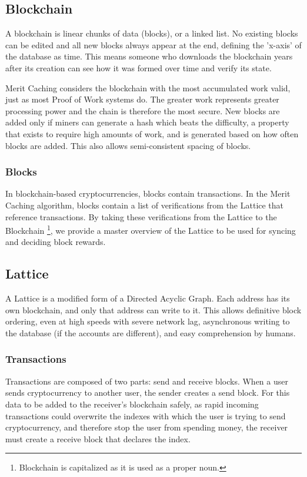 \documentclass[14pt]{article}
\begin{document}
\label{sec:1.1}
\subsection{Blockchain}
A blockchain is linear chunks of data (blocks), or a linked list. No existing blocks can be edited and all new blocks always appear at the end, defining the 'x-axis' of the database as time. This means someone who downloads the blockchain years after its creation can see how it was formed over time and verify its state. 

Merit Caching considers the blockchain with the most accumulated work valid, just as most Proof of Work systems do. The greater work represents greater processing power and the chain is therefore the most secure. New blocks are added only if miners can generate a hash which beats the difficulty, a property that exists to require high amounts of work, and is generated based on how often blocks are added. This also allows semi-consistent spacing of blocks.

\label{sec:1.1.1}
\subsubsection{Blocks}
In blockchain-based cryptocurrencies, blocks contain transactions. In the Merit Caching algorithm, blocks contain a list of verifications from the Lattice that reference transactions. By taking these verifications from the Lattice to the Blockchain \footnote{Blockchain is capitalized as it is used as a proper noun.}, we provide a master overview of the Lattice to be used for syncing and deciding block rewards.

\label{sec:1.2}
\subsection{Lattice}
A Lattice is a modified form of a Directed Acyclic Graph. Each address has its own blockchain, and only that address can write to it. This allows definitive block ordering, even at high speeds with severe network lag, asynchronous writing to the database (if the accounts are different), and easy comprehension by humans.

\label{sec:1.2.1}
\subsubsection{Transactions}
Transactions are composed of two parts: send and receive blocks. When a user sends cryptocurrency to another user, the sender creates a send block. For this data to be added to the receiver's blockchain safely, as rapid incoming transactions could overwrite the indexes with which the user is trying to send cryptocurrency, and therefore stop the user from spending money, the receiver must create a receive block that declares the index.
\end{document}
